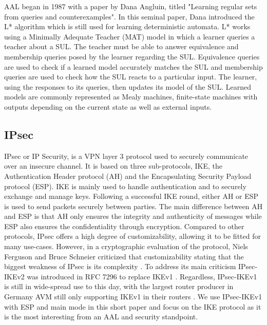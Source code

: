 \documentclass[runningheads]{llncs}
\begin{document}
AAL began in 1987 with a paper by Dana Angluin, titled "Learning regular sets from queries and counterexamples"\cite{ANGLUIN198787}. In this seminal paper, Dana introduced the L* algorithm which is still used for learning deterministic automata. L* works using a Minimally Adequate Teacher (MAT) model in which a learner queries a teacher about a SUL. The teacher must be able to answer equivalence and membership queries posed by the learner regarding the SUL. Equivalence queries are used to check if a learned model accurately matches the SUL and membership queries are used to check how the SUL reacts to a particular input. The learner, using the responses to its queries, then updates its model of the SUL. Learned models are commonly represented as Mealy machines, finite-state machines with outputs depending on the current state as well as external inputs. %

\subsection{IPsec}
IPsec or IP Security, is a VPN layer 3 protocol used to securely communicate over an insecure channel. It is based on three sub-protocols, IKE, the Authentication Header protocol (AH) and the Encapsulating Security Payload protocol (ESP). IKE is mainly used to handle authentication and to securely exchange and manage keys. Following a successful IKE round, either AH or ESP is used to send packets securely between parties. The main difference between AH and ESP is that AH only ensures the integrity and authenticity of messages while ESP also ensures the confidentiality through encryption.
Compared to other protocols, IPsec offers a high degree of customizability, allowing it to be fitted for many use-cases. However, in a cryptographic evaluation of the protocol, Niels Ferguson and Bruce Schneier criticized that customizability stating that the biggest weakness of IPsec is its complexity \cite{ferguson1999cryptographic}. To address its main criticism IPsec-IKEv2 was introduced in RFC 7296 to replace IKEv1 \cite{kaufman2014internet}. Regardless, IPsec-IKEv1 is still in wide-spread use to this day, with the largest router producer in Germany AVM still only supporting IKEv1 in their routers \cite{avm2022}. We use IPsec-IKEv1 with ESP and main mode in this short paper and focus on the IKE protocol as it is the most interesting from an AAL and security standpoint. %
\end{document}
